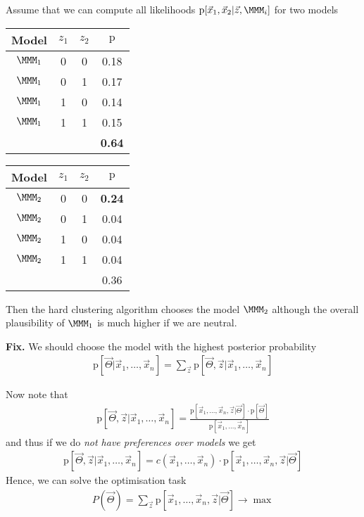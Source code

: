 \documentclass[landscape,footrule]{foils}
\newcommand{\pd}[1]{\mathrm{p}[#1]}
\begin{document}


\enlargethispage{1cm}
Assume that we can compute all likelihoods $\pd{\vec{x}_1,\vec{x}_2|\vec{z},\MMM_i}$ for two models

\begin{center}
\begin{tabular}{cccc}
Model    & $z_1$ & $z_2$ & $\mathrm{p}$\\
\hline
$\MMM_1$ & 0 & 0 & 0.18\\
$\MMM_1$ & 0 & 1 & 0.17\\
$\MMM_1$ & 1 & 0 & 0.14\\
$\MMM_1$ & 1 & 1 & 0.15\\
\hline
&&& \textbf{0.64}
\end{tabular}\hspace*{2cm}
\begin{tabular}{cccc}
Model    & $z_1$ & $z_2$ & $\mathrm{p}$\\
\hline
$\MMM_2$ & 0 & 0 & \textbf{0.24}\\
$\MMM_2$ & 0 & 1 & 0.04\\
$\MMM_2$ & 1 & 0 & 0.04\\
$\MMM_2$ & 1 & 1 & 0.04\\
\hline
&&& 0.36
\end{tabular}
\end{center}
Then the hard clustering algorithm chooses the model $\MMM_2$ although the overall plausibility of $\MMM_1$ is much higher if we are neutral. 

\textbf{Fix.} We should choose the model with the highest posterior probability
\begin{align*}
\pd{\vec{\Theta}|\vec{x}_1,\ldots,\vec{x}_n}=\sum_{\vec{z}}\pd{\vec{\Theta},\vec{z}|\vec{x}_1,\ldots,\vec{x}_n}
\end{align*}


Now note that 
\begin{align*}
\pd{\vec{\Theta},\vec{z}|\vec{x}_1,\ldots,\vec{x}_n}=\frac{\pd{\vec{x}_1,\ldots,\vec{x}_n,\vec{z}|\vec{\Theta}} \cdot\pd{\vec{\Theta}}}{\pd{\vec{x}_1,\ldots,\vec{x}_n}}
\end{align*}
and thus if we do \emph{not have preferences over models} we get 
\begin{align*}
\pd{\vec{\Theta},\vec{z}|\vec{x}_1,\ldots,\vec{x}_n}=c(\vec{x}_1,\ldots,\vec{x}_n)\cdot\pd{\vec{x}_1,\ldots,\vec{x}_n,\vec{z}|\vec{\Theta}} 
\end{align*}
Hence, we can solve the optimisation task
\begin{align*}
P(\vec{\Theta})=\sum_{\vec{z}}\pd{\vec{x}_1,\ldots,\vec{x}_n,\vec{z}|\vec{\Theta}}\to\max 
\end{align*}
\end{document}
